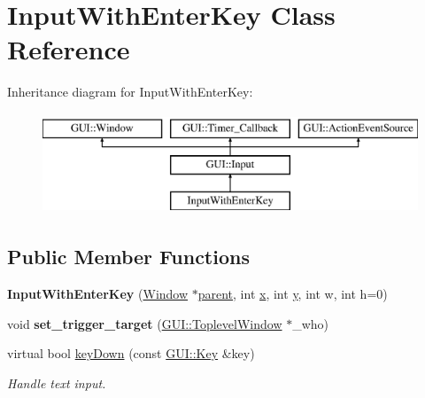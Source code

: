 \hypertarget{classInputWithEnterKey}{\section{Input\-With\-Enter\-Key Class Reference}
\label{classInputWithEnterKey}
}
Inheritance diagram for Input\-With\-Enter\-Key\-:\begin{figure}[H]
\begin{center}
\leavevmode
\includegraphics[height=3.000000cm]{classInputWithEnterKey}
\end{center}
\end{figure}
\subsection*{Public Member Functions}
\begin{DoxyCompactItemize}
\item 
\hypertarget{classInputWithEnterKey_a73f3a1afbbc586e9612b5930f9b6a21e}{{\bfseries Input\-With\-Enter\-Key} (\hyperlink{classGUI_1_1Window_ae828e9daa964dfc65a3550fb03117d30}{Window} $\ast$\hyperlink{classGUI_1_1Window_a2e593ff65e7702178d82fe9010a0b539}{parent}, int \hyperlink{classGUI_1_1Window_a6ca6a80ca00c9e1d8ceea8d3d99a657d}{x}, int \hyperlink{classGUI_1_1Window_a0ee8e923aff2c3661fc2e17656d37adf}{y}, int w, int h=0)}\label{classInputWithEnterKey_a73f3a1afbbc586e9612b5930f9b6a21e}

\item 
\hypertarget{classInputWithEnterKey_a6dfe84e2d82786b2b9d3530704bf4130}{void {\bfseries set\-\_\-trigger\-\_\-target} (\hyperlink{classGUI_1_1ToplevelWindow}{G\-U\-I\-::\-Toplevel\-Window} $\ast$\-\_\-who)}\label{classInputWithEnterKey_a6dfe84e2d82786b2b9d3530704bf4130}

\item 
\hypertarget{classInputWithEnterKey_af2cf7e73ba6a0ee935d3782d987d62c2}{virtual bool \hyperlink{classInputWithEnterKey_af2cf7e73ba6a0ee935d3782d987d62c2}{key\-Down} (const \hyperlink{classGUI_1_1Key}{G\-U\-I\-::\-Key} \&key)}\label{classInputWithEnterKey_af2cf7e73ba6a0ee935d3782d987d62c2}

\begin{DoxyCompactList}\small\item\em Handle text input. \end{DoxyCompactList}\end{DoxyCompactItemize}
